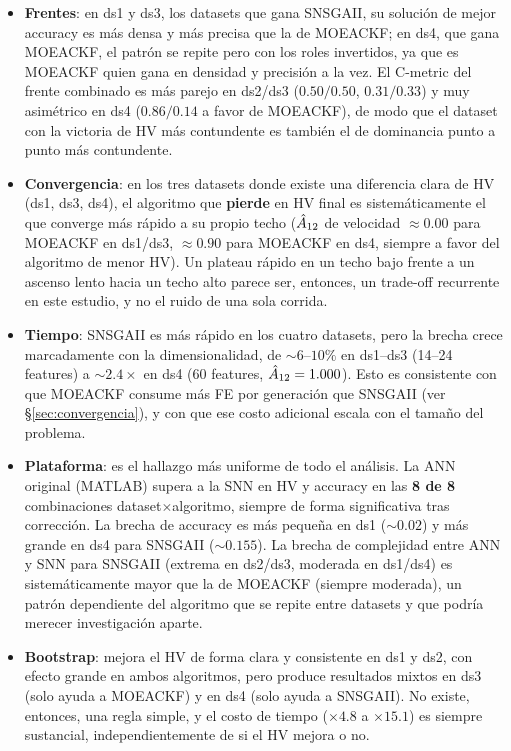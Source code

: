 \begin{itemize}
  \item \textbf{Frentes}: en ds1 y ds3, los datasets que gana SNSGAII, su solución de mejor
        accuracy es más densa y más precisa que la de MOEACKF; en ds4, que gana MOEACKF, el
        patrón se repite pero con los roles invertidos, ya que es MOEACKF quien gana en densidad
        y precisión a la vez. El C-metric del frente combinado es más parejo en ds2/ds3
        ($0.50/0.50$, $0.31/0.33$) y muy asimétrico en ds4 ($0.86/0.14$ a favor de MOEACKF), de
        modo que el dataset con la victoria de HV más contundente es también el de dominancia
        punto a punto más contundente.
  \item \textbf{Convergencia}: en los tres datasets donde existe una diferencia clara de HV (ds1,
        ds3, ds4), el algoritmo que \textbf{pierde} en HV final es sistemáticamente el que
        converge más rápido a su propio techo ($\hat{A}_{12}$ de velocidad $\approx0.00$ para
        MOEACKF en ds1/ds3, $\approx0.90$ para MOEACKF en ds4, siempre a favor del algoritmo de
        menor HV). Un plateau rápido en un techo bajo frente a un ascenso lento hacia un techo
        alto parece ser, entonces, un trade-off recurrente en este estudio, y no el ruido de una
        sola corrida.
  \item \textbf{Tiempo}: SNSGAII es más rápido en los cuatro datasets, pero la brecha crece
        marcadamente con la dimensionalidad, de $\sim6$--$10\%$ en ds1--ds3 (14--24 features) a
        $\sim2.4\times$ en ds4 (60 features, $\hat{A}_{12}=1.000$). Esto es consistente con que
        MOEACKF consume más FE por generación que SNSGAII (ver \S\ref{sec:convergencia}), y con
        que ese costo adicional escala con el tamaño del problema.
  \item \textbf{Plataforma}: es el hallazgo más uniforme de todo el análisis. La ANN original
        (MATLAB) supera a la SNN en HV y accuracy en las \textbf{8 de 8} combinaciones
        dataset$\times$algoritmo, siempre de forma significativa tras corrección. La brecha de
        accuracy es más pequeña en ds1 ($\sim0.02$) y más grande en ds4 para SNSGAII
        ($\sim0.155$). La brecha de complejidad entre ANN y SNN para SNSGAII (extrema en ds2/ds3,
        moderada en ds1/ds4) es sistemáticamente mayor que la de MOEACKF (siempre moderada), un
        patrón dependiente del algoritmo que se repite entre datasets y que podría merecer
        investigación aparte.
  \item \textbf{Bootstrap}: mejora el HV de forma clara y consistente en ds1 y ds2, con efecto
        grande en ambos algoritmos, pero produce resultados mixtos en ds3 (solo ayuda a MOEACKF)
        y en ds4 (solo ayuda a SNSGAII). No existe, entonces, una regla simple, y el costo de
        tiempo ($\times4.8$ a $\times15.1$) es siempre sustancial, independientemente de si el HV
        mejora o no.
\end{itemize}

